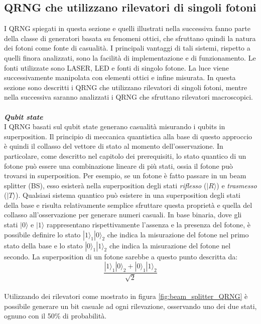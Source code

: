 \subsection{QRNG che utilizzano rilevatori di singoli fotoni} \label{QRNG_ottici}
I QRNG spiegati in questa sezione e quelli illustrati nella successiva fanno parte della classe di generatori basata su fenomeni ottici, che sfruttano quindi la natura dei fotoni come fonte di casualità. I principali vantaggi di tali sistemi, rispetto a quelli finora analizzati, sono la facilità di implementazione e di funzionamento. Le fonti utilizzate sono LASER, LED e fonti di singolo fotone. La luce viene successivamente manipolata con elementi ottici e infine misurata. In questa sezione sono descritti i QRNG che utilizzano rilevatori di singoli fotoni, mentre nella successiva saranno analizzati i QRNG che sfruttano rilevatori macroscopici.
\\
\\
\textit{\textbf{Qubit state}}\\
I QRNG basati sul qubit state generano casualità misurando i qubits in superposition. Il principio di meccanica quantistica alla base di questo approccio è quindi il collasso del vettore di stato al momento dell'osservazione. In particolare, come descritto nel capitolo dei prerequisiti, lo stato quantico di un fotone può essere una combinazione lineare di più stati, ossia il fotone può trovarsi in superposition. Per esempio, se un fotone è fatto passare in un beam splitter (BS), esso esisterà nella superposition degli stati \textit{riflesso} ($|R\rangle$) e \textit{trasmesso} ($|T\rangle$). Qualsiasi sistema quantico può esistere in una superposition degli stati della base e risulta relativamente semplice sfruttare questa proprietà e quella del collasso all'osservazione per generare numeri casuali. In base binaria, dove gli stati $|0\rangle$ e $|1\rangle$ rappresentano rispettivamente l'assenza e la presenza del fotone, è possibile definire lo stato $|1\rangle_1|0\rangle_2$ che indica la misurazione del fotone nel primo stato della base e lo stato $|0\rangle_1|1\rangle_2$ che indica la misurazione del fotone nel secondo. La superposition di un fotone sarebbe a questo punto descritta da:
\\
\[\frac{|1\rangle_1|0\rangle_2+|0\rangle_1|1\rangle_2}{\sqrt{2}}\]
\\
Utilizzando dei rilevatori come mostrato in figura \ref{fig:beam_splitter_QRNG} è possibile generare un bit casuale ad ogni rilevazione, osservando uno dei due stati, ognuno con il 50\% di probabilità.
